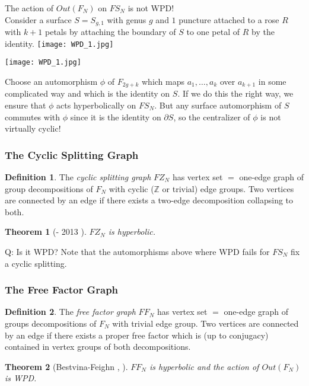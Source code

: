\documentclass{beamer}
\theoremstyle{theorem}
\newtheorem{thm}{Theorem}
\theoremstyle{definition}
\newtheorem*{defin}{Definition}
\newcommand{\Z}{\ensuremath{\mathbb Z}}
\renewcommand{\-}{\ensuremath{^{-1}}}
\renewcommand{\>}{\ensuremath{\rightarrow}}
\newcommand{\del}{\partial}
\renewcommand{\(}{\langle}
\renewcommand{\)}{\rangle}
\begin{document}
\begin{frame}
The action of $Out(F_N)$ on $FS_N$ is not WPD! \\
\pause
Consider a surface $S = S_{g,1}$ with genus $g$ and $1$ puncture attached to a rose $R$ with $k+1$ petals by attaching the boundary of $S$ to one petal of $R$ by the identity.
\pause
\texttt{[image: WPD\_1.jpg]}
\end{frame}

\begin{frame}
\texttt{[image: WPD\_1.jpg]}

Choose an automorphism $\phi$ of $F_{2g + k}$ which maps $a_1, \ldots, a_k$ over $a_{k+1}$ in some complicated way and which is the identity on $S$. If we do this the right way, we ensure that $\phi$ acts hyperbolically on $FS_N$. But any surface automorphism of $S$ commutes with $\phi$ since it is the identity on $\del S$, so the centralizer of $\phi$ is not virtually cyclic!
\end{frame}

\begin{frame}
\frametitle{The Cyclic Splitting Graph}

\begin{defin}
The \emph{cyclic splitting graph} $FZ_N$ has vertex set $=$ one-edge graph of group decompositions of $F_N$ with cyclic ($\Z$ or trivial) edge groups. Two vertices are connected by an edge if there exists a two-edge decomposition collapsing to both.
\end{defin}
\pause
\begin{thm}[- 2013 \cite{Mann13}]
$FZ_N$ is hyperbolic.
\end{thm}
\pause
Q: Is it WPD?
\pause
Note that the automorphisms above where WPD fails for $FS_N$ fix a cyclic splitting.
\end{frame}

\begin{frame}
\frametitle{The Free Factor Graph}
\begin{defin}
The \emph{free factor graph} $FF_N$ has vertex set $=$ one-edge graph of groups decompositions of $F_N$ with trivial edge group. Two vertices are connected by an edge if there exists a proper free factor which is (up to conjugacy) contained in vertex groups of both decompositions.
\end{defin}
\pause
\begin{thm}[Bestvina-Feighn \cite{BF09}, \cite{BF11}]
$FF_N$ is hyperbolic and the action of $Out(F_N)$ is WPD.
\end{thm}
\end{frame}
\end{document}
